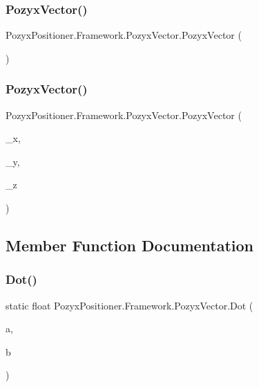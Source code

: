 \subsubsection{\texorpdfstring{Pozyx\+Vector()}{PozyxVector()}\hspace{0.1cm}{\footnotesize\ttfamily [1/2]}}
{\footnotesize\ttfamily Pozyx\+Positioner.\+Framework.\+Pozyx\+Vector.\+Pozyx\+Vector (\begin{DoxyParamCaption}{ }\end{DoxyParamCaption})}

\mbox{\label{struct_pozyx_positioner_1_1_framework_1_1_pozyx_vector_aefc563d4720d301eaf6bd2cb62858c01}} 
\subsubsection{\texorpdfstring{Pozyx\+Vector()}{PozyxVector()}\hspace{0.1cm}{\footnotesize\ttfamily [2/2]}}
{\footnotesize\ttfamily Pozyx\+Positioner.\+Framework.\+Pozyx\+Vector.\+Pozyx\+Vector (\begin{DoxyParamCaption}\item[{float}]{\+\_\+x,  }\item[{float}]{\+\_\+y,  }\item[{float}]{\+\_\+z }\end{DoxyParamCaption})}



\subsection{Member Function Documentation}
\mbox{\label{struct_pozyx_positioner_1_1_framework_1_1_pozyx_vector_a9f39baf405504f414136b7f9a661dad8}} 
\subsubsection{\texorpdfstring{Dot()}{Dot()}}
{\footnotesize\ttfamily static float Pozyx\+Positioner.\+Framework.\+Pozyx\+Vector.\+Dot (\begin{DoxyParamCaption}\item[{\hyperlink{struct_pozyx_positioner_1_1_framework_1_1_pozyx_vector}{Pozyx\+Vector}}]{a,  }\item[{\hyperlink{struct_pozyx_positioner_1_1_framework_1_1_pozyx_vector}{Pozyx\+Vector}}]{b }\end{DoxyParamCaption})\hspace{0.3cm}{\ttfamily [static]}}


